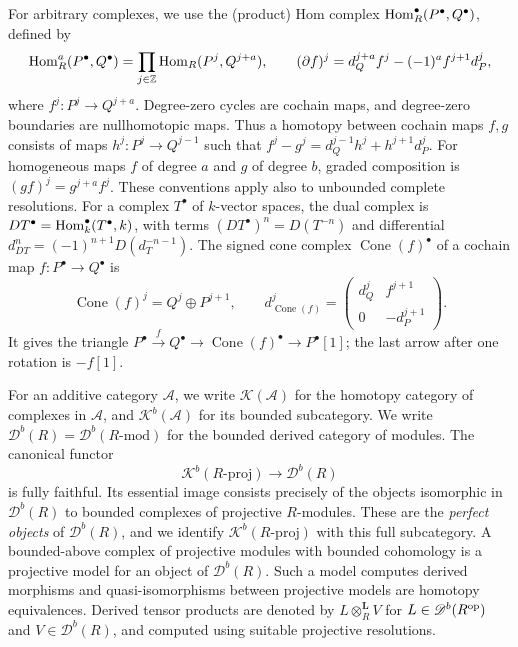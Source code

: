 \documentclass[11pt]{article}
\begin{document}
For arbitrary complexes, we use the (product) Hom complex
${\rm Hom}_R^\bullet(P^\bullet,Q^\bullet)$, defined by
\begin{equation*}
 {\rm Hom}_R^a(P^\bullet,Q^\bullet)
 =\prod_{j\in\mathbb Z}{\rm Hom}_R(P^j,Q^{j+a}),\qquad
 (\partial f)^j=d_Q^{j+a}f^j-(-1)^a f^{j+1}d_P^j,
\end{equation*}
where $f^j:P^j\to Q^{j+a}$. Degree-zero cycles are cochain maps,
and degree-zero boundaries are nullhomotopic maps. Thus a homotopy
between cochain maps $f,g$ consists of maps $h^j:P^j\to Q^{j-1}$
such that $f^j-g^j=d_Q^{j-1}h^j+h^{j+1}d_P^j$.
For homogeneous maps $f$ of degree $a$ and $g$ of degree $b$,
graded composition is $(gf)^j=g^{j+a}f^j$.
These conventions apply also to unbounded complete resolutions.
For a complex $T^\bullet$ of $k$-vector spaces, the dual complex is
$DT^\bullet={\rm Hom}_k^\bullet(T^\bullet,k)$, with terms
$(DT^\bullet)^n=D(T^{-n})$ and differential
$d_{DT}^n=(-1)^{n+1}D(d_T^{-n-1})$. The signed cone complex $\operatorname{Cone}(f)^\bullet$ of a
cochain map $f:P^\bullet\to Q^\bullet$ is
\begin{equation}\label{prelim:signed-cone}
 \operatorname{Cone}(f)^j=Q^j\oplus P^{j+1},\qquad
 d_{\operatorname{Cone}(f)}^j=
 \begin{pmatrix}d_Q^j&f^{j+1}\\0&-d_P^{j+1}\end{pmatrix}.
\end{equation}
It gives the triangle
$P^\bullet\xrightarrow{f}Q^\bullet\to\operatorname{Cone}(f)^\bullet\to P^\bullet[1]$;
the last arrow after one rotation is $-f[1]$.

For an additive category $\mathcal A$, we write $\mathscr K(\mathcal A)$
for the homotopy category of complexes in $\mathcal A$, and
$\mathscr K^b(\mathcal A)$ for its bounded subcategory.
We write $\mathscr D^b(R)=\mathscr D^b(R\text{-}\mathrm{mod})$ for
the bounded derived category of modules. The canonical functor
\[
 \mathscr K^b(R\text{-}\mathrm{proj})\longrightarrow\mathscr D^b(R)
\]
is fully faithful. Its essential image consists precisely of the objects
isomorphic in $\mathscr D^b(R)$ to bounded complexes of projective
$R$-modules. These are the \emph{perfect objects} of $\mathscr D^b(R)$,
and we identify $\mathscr K^b(R\text{-}\mathrm{proj})$ with this full subcategory. A bounded-above complex of
projective modules with bounded cohomology is a projective model
for an object of $\mathscr D^b(R)$. Such a model computes derived
morphisms and quasi-isomorphisms between projective models are homotopy
equivalences.  Derived tensor products are denoted by
$L\otimes_R^{\mathbf L}V$ for $L\in \mathscr D^b(R^{\rm op})$ and $V\in\mathscr D^b(R)$, and
computed using suitable projective resolutions.
\end{document}
